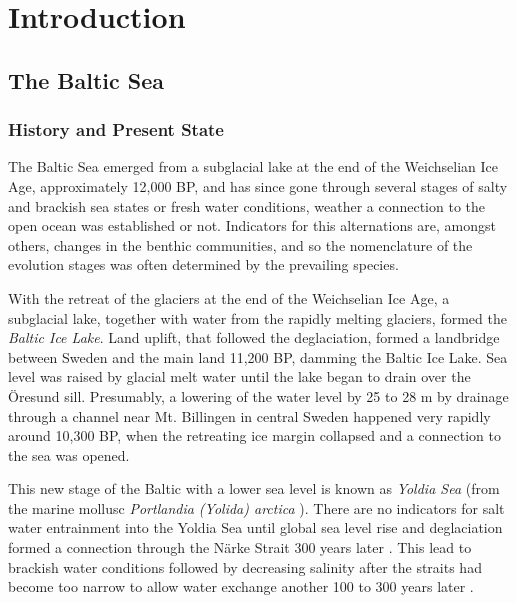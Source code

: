 \chapter{Introduction}
\label{kap-einleitung}



\section{The Baltic Sea}

\subsection{History and Present State}

The Baltic Sea emerged from a subglacial lake at the end of the Weichselian Ice Age, approximately 12,000 BP, and has since gone through several stages of salty and brackish sea states or fresh water conditions, weather a connection to the open ocean was established or not. Indicators for this alternations are, amongst others, changes in the benthic communities, and so the nomenclature of the evolution stages was often determined by the prevailing species.

With the retreat of the glaciers at the end of the Weichselian Ice Age, a subglacial lake, together with water from the rapidly melting glaciers, formed the \textit{Baltic Ice Lake}. Land uplift, that followed the deglaciation, formed a landbridge between Sweden and the main land 11,200 BP, damming the Baltic Ice Lake. Sea level was raised by glacial melt water until the lake began to drain over the Öresund sill. Presumably, a lowering of the water level by 25 to 28 m by drainage through a channel near Mt. Billingen in central Sweden happened very rapidly around 10,300 BP, when the retreating ice margin collapsed \citep[][]{bjoerk95,tikkanen2002} and a connection to the sea was opened. 

This new stage of the Baltic with a lower sea level is known as \textit{Yoldia Sea} (from the marine mollusc \textit{Portlandia (Yolida) arctica} \citep[][]{schoning2001}). There are no indicators for salt water entrainment into the Yoldia Sea until global sea level rise and deglaciation formed a connection through the Närke Strait 300 years later \citep[][]{schoning2001}. This lead to brackish water conditions followed by decreasing salinity after the straits had become too narrow to allow water exchange another 100 to 300 years later \citep[][]{bjoerk95}.

